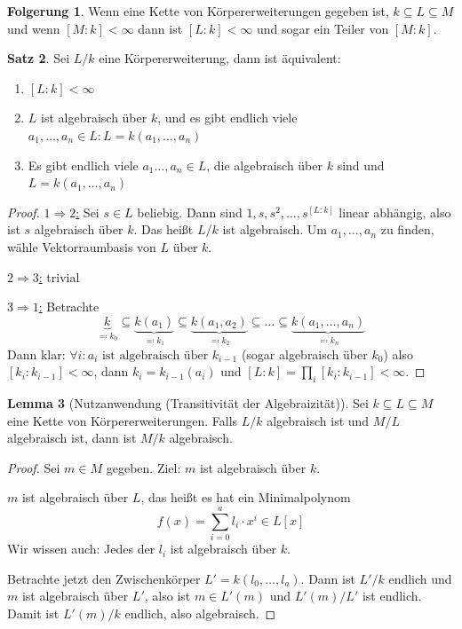 \documentclass[12pt,parskip=full]{scrartcl}
\newcommand{\heading}{\underline}
\theoremstyle{definition}
\newtheorem{theorem}{Satz}[section]
\newtheorem{corollary}[theorem]{Folgerung}
\newtheorem{lemma}[theorem]{Lemma}
\theoremstyle{remark}
\begin{document}
	\begin{corollary}
		Wenn eine Kette von Körpererweiterungen gegeben ist, $k \subseteq L \subseteq M$ und wenn $[M:k] < \infty$ dann ist $[L:k] < \infty$ und sogar ein Teiler von $[M:k]$.
	\end{corollary}

	\begin{theorem}
		Sei $L/k$ eine Körpererweiterung, dann ist äquivalent:
		\begin{enumerate}
			\item $[L:k] < \infty$
			\item $L$ ist algebraisch über $k$, und es gibt endlich viele $a_1, \dots, a_n \in L: L = k(a_1, \dots, a_n)$
			\item Es gibt endlich viele $a_1 \dots, a_n \in L$, die algebraisch über $k$ sind und $L = k(a_1, \dots, a_n)$
		\end{enumerate}
	\end{theorem}

	\begin{proof}
		\heading{$1 \Rightarrow 2$:} Sei $s \in L$ beliebig. Dann sind $1,s,s^2, \dots, s^{[L:k]}$ linear abhängig, also ist $s$ algebraisch über $k$. Das heißt $L/k$ ist algebraisch.
		Um $a_1, \dots, a_n$ zu finden, wähle Vektorraumbasis von $L$ über $k$.
		
		\heading{$2 \Rightarrow 3$:} trivial
		
		\heading{$3 \Rightarrow 1$:} Betrachte
		\begin{equation*}
			\underbrace{k}_{\eqqcolon k_0} \subseteq \underbrace{k(a_1)}_{\eqqcolon k_1} \subseteq \underbrace{k(a_1, a_2)}_{\eqqcolon k_2} \subseteq \dots \subseteq \underbrace{k(a_1, \dots, a_n)}_{\eqqcolon k_n}
		\end{equation*}
		Dann klar: $\forall i: a_i \text{ ist algebraisch über } k_{i-1}$ (sogar algebraisch über $k_0$) also $[k_i: k_{i-1}] < \infty$, dann $k_i = k_{i-1}(a_i)$ und $[L:k] = \prod_i [k_i: k_{i-1}] < \infty$.
	\end{proof}

	\begin{lemma}[Nutzanwendung (Transitivität der Algebraizität)]
		Sei $k \subseteq L \subseteq M$ eine Kette von Körpererweiterungen. Falls $L/k$ algebraisch ist und $M/L$ algebraisch ist, dann ist $M/k$ algebraisch.
	\end{lemma}

	\begin{proof}
		Sei $m \in M$ gegeben. Ziel: $m$ ist algebraisch über $k$.
		
		$m$ ist algebraisch über $L$, das heißt es hat ein Minimalpolynom
		\begin{equation*}
			f(x) = \sum_{i=0}^a l_i \cdot x^i \in L[x]
		\end{equation*}
		Wir wissen auch: Jedes der $l_i$ ist algebraisch über $k$.
		
		Betrachte jetzt den Zwischenkörper $L' = k(l_0, \dots, l_a)$. Dann ist $L'/k$ endlich und $m$ ist algebraisch über $L'$, also ist $m \in L'(m)$ und $L'(m)/L'$ ist endlich. Damit ist $L'(m)/k$ endlich, also algebraisch.
	\end{proof}
\end{document}
